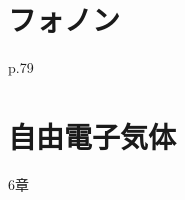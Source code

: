 \documentclass[a4paper]{jsreport}
\begin{document}
        \section{}
        \section{}
        \section{}
        \section{}
        
        

    \chapter{フォノン}
        p.79~
        \section{}
        \section{}
        \section{}
        \section{}
        \section{}
        \section{}
        \section{}
    \section{}
        
    \chapter{自由電子気体}
        6章
\end{document}
